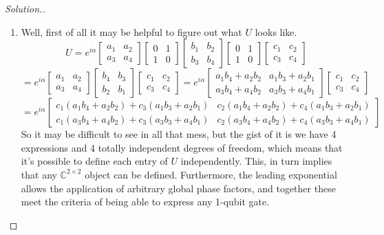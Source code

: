 \documentclass[12pt]{article}
\begin{document}
\begin{proof}[Solution.]
\begin{enumerate}[label=(\alph*)]
\item Well, first of all it may be helpful to figure out what $U$ looks
like.
$$U=e^{i\alpha}\begin{bmatrix}
a_1 & a_2\\
a_3 & a_4
\end{bmatrix}\begin{bmatrix}
0 & 1\\
1 & 0
\end{bmatrix}\begin{bmatrix}
b_1 & b_2\\
b_3 & b_4
\end{bmatrix}\begin{bmatrix}
0 & 1\\
1 & 0
\end{bmatrix}\begin{bmatrix}
c_1 & c_2\\
c_3 & c_4
\end{bmatrix}$$
$$=e^{i\alpha}\begin{bmatrix}
a_1 & a_2\\
a_3 & a_4
\end{bmatrix}\begin{bmatrix}
b_4 & b_3\\
b_2 & b_1
\end{bmatrix}\begin{bmatrix}
c_1 & c_2\\
c_3 & c_4
\end{bmatrix}=e^{i\alpha}\begin{bmatrix}
a_1b_4+a_2b_2 & a_1b_3+a_2b_1\\
a_3b_4+a_4b_2 & a_3b_3+a_4b_1
\end{bmatrix}\begin{bmatrix}
c_1 & c_2\\
c_3 & c_4
\end{bmatrix}$$
$$=e^{i\alpha}\begin{bmatrix}
c_1(a_1b_4+a_2b_2)+c_3(a_1b_3+a_2b_1) & c_2(a_1b_4+a_2b_2)+c_4(a_1b_3+a_2b_1)\\
c_1(a_3b_4+a_4b_2)+c_3(a_3b_3+a_4b_1) &
c_2(a_3b_4+a_4b_2)+c_4(a_3b_3+a_4b_1)
\end{bmatrix}$$
So it may be difficult to see in all that mess, but the gist of it is we
have 4 expressions and 4 totally independent degrees of freedom, which
means that it's possible to define each entry of $U$ independently. This, in turn
implies that any $\mathbb{C}^{2\times2}$ object can be defined.
Furthermore, the leading exponential allows the application of arbitrary
global phase factors, and together these meet the criteria of being able
to express any 1-qubit gate.
\end{enumerate}
\end{proof}
\end{document}
